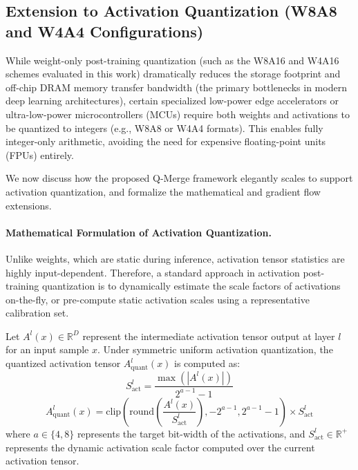 \subsection{Extension to Activation Quantization (W8A8 and W4A4 Configurations)}
\label{subsec:activation_quant}

While weight-only post-training quantization (such as the W8A16 and W4A16 schemes evaluated in this work) dramatically reduces the storage footprint and off-chip DRAM memory transfer bandwidth (the primary bottlenecks in modern deep learning architectures), certain specialized low-power edge accelerators or ultra-low-power microcontrollers (MCUs) require both weights and activations to be quantized to integers (e.g., W8A8 or W4A4 formats). This enables fully integer-only arithmetic, avoiding the need for expensive floating-point units (FPUs) entirely.

We now discuss how the proposed Q-Merge framework elegantly scales to support activation quantization, and formalize the mathematical and gradient flow extensions.

\paragraph{Mathematical Formulation of Activation Quantization.}
Unlike weights, which are static during inference, activation tensor statistics are highly input-dependent. Therefore, a standard approach in activation post-training quantization is to dynamically estimate the scale factors of activations on-the-fly, or pre-compute static activation scales using a representative calibration set.

Let $A^l(x) \in \mathbb{R}^D$ represent the intermediate activation tensor output at layer $l$ for an input sample $x$. Under symmetric uniform activation quantization, the quantized activation tensor $A^l_{\text{quant}}(x)$ is computed as:
\begin{equation}
    S^l_{\text{act}} = \frac{\max(|A^l(x)|)}{2^{a-1} - 1}
\end{equation}
\begin{equation}
    A^l_{\text{quant}}(x) = \text{clip}\left( \text{round}\left( \frac{A^l(x)}{S^l_{\text{act}}} \right), -2^{a-1}, 2^{a-1}-1 \right) \times S^l_{\text{act}}
\end{equation}
where $a \in \{4, 8\}$ represents the target bit-width of the activations, and $S^l_{\text{act}} \in \mathbb{R}^+$ represents the dynamic activation scale factor computed over the current activation tensor.

